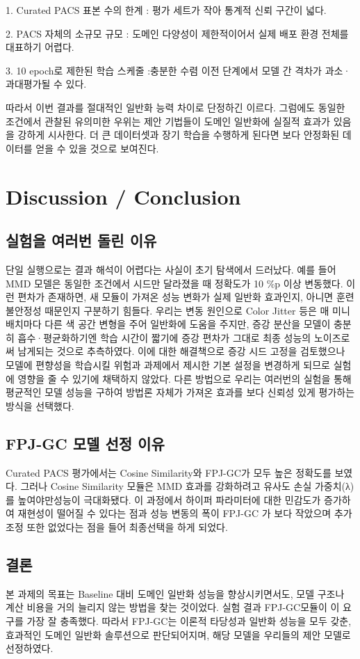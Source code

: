 1. Curated PACS 표본 수의 한계
: 평가 세트가 작아 통계적 신뢰 구간이 넓다.

2. PACS 자체의 소규모 규모
: 도메인 다양성이 제한적이어서 실제 배포 환경 전체를 대표하기 어렵다.

3. 10 epoch로 제한된 학습 스케줄
:충분한 수렴 이전 단계에서 모델 간 격차가 과소·과대평가될 수 있다.

따라서 이번 결과를 절대적인 일반화 능력 차이로 단정하긴 이르다. 그럼에도 동일한 조건에서 관찰된 유의미한 우위는 제안 기법들이 도메인 일반화에 실질적 효과가 있음을 강하게 시사한다. 더 큰 데이터셋과 장기 학습을 수행하게 된다면 보다 안정화된 데이터를 얻을 수 있을 것으로 보여진다.

\section{Discussion / Conclusion}
\subsection{실험을 여러번 돌린 이유}
단일 실행으로는 결과 해석이 어렵다는 사실이 초기 탐색에서 드러났다.
예를 들어 MMD 모델은 동일한 조건에서 시드만 달라졌을 때 정확도가 10 \%p 이상 변동했다. 이런 편차가 존재하면, 새 모듈이 가져온 성능 변화가 실제 일반화 효과인지, 아니면 훈련 불안정성 때문인지 구분하기 힘들다.
우리는 변동 원인으로 Color Jitter 등은 매 미니배치마다 다른 색 공간 변형을 주어 일반화에 도움을 주지만, 증강 분산을 모델이 충분히 흡수·평균화하기엔 학습 시간이 짧기에 증강 편차가 그대로 최종 성능의 노이즈로써 남게되는 것으로 추측하였다. 이에 대한 해결책으로 증강 시드 고정을 검토했으나 모델에 편향성을 학습시킬 위험과 과제에서 제시한 기본 설정을 변경하게 되므로 실험에 영향을 줄 수 있기에 채택하지 않았다. 다른 방법으로 우리는 여러번의 실험을 통해 평균적인 모델 성능을 구하여 방법론 자체가 가져온 효과를 보다 신뢰성 있게 평가하는 방식을 선택했다.

\subsection{FPJ-GC 모델 선정 이유}
Curated PACS 평가에서는 Cosine Similarity와 FPJ-GC가 모두 높은 정확도를 보였다. 그러나 Cosine Similarity 모듈은 MMD 효과를 강화하려고 유사도 손실 가중치(λ)를 높여야만성능이 극대화됐다. 이 과정에서 하이퍼 파라미터에 대한 민감도가 증가하여 재현성이 떨어질 수 있다는 점과 성능 변동의 폭이 FPJ-GC 가 보다 작았으며 추가조정 또한 없었다는 점을 들어 최종선택을 하게 되었다.

\subsection{결론}
본 과제의 목표는 Baseline 대비 도메인 일반화 성능을 향상시키면서도, 모델 구조나 계산 비용을 거의 늘리지 않는 방법을 찾는 것이었다. 실험 결과 FPJ-GC모듈이 이 요구를 가장 잘 충족했다. 따라서 FPJ-GC는 이론적 타당성과 일반화 성능을 모두 갖춘, 효과적인 도메인 일반화 솔루션으로 판단되어지며, 해당 모델을 우리들의 제안 모델로 선정하였다.

